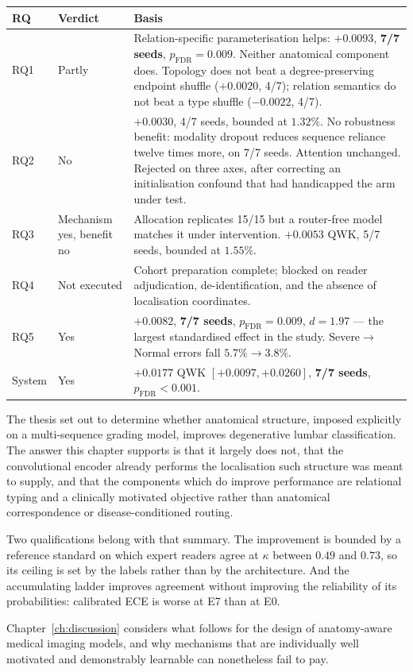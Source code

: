\documentclass[12pt,a4paper]{report}
\begin{document}
\begin{center}
\begin{tabular}{llp{6.6cm}}
\toprule
RQ & Verdict & Basis \\
\midrule
RQ1 & Partly & Relation-specific parameterisation helps: $+0.0093$,
\textbf{7/7 seeds}, $p_{\mathrm{FDR}} = 0.009$. Neither anatomical component
does. Topology does not beat a degree-preserving endpoint shuffle ($+0.0020$,
4/7); relation semantics do not beat a type shuffle ($-0.0022$, 4/7). \\
RQ2 & No & $+0.0030$, 4/7 seeds, bounded at $1.32\%$. No robustness
benefit: modality dropout reduces sequence reliance twelve times more, on 7/7
seeds. Attention unchanged. Rejected on three axes, after correcting an
initialisation confound that had handicapped the arm under test. \\
RQ3 & Mechanism yes, benefit no & Allocation replicates 15/15 but a router-free
model matches it under intervention. $+0.0053$ QWK, 5/7 seeds, bounded at
$1.55\%$. \\
RQ4 & Not executed & Cohort preparation complete; blocked on reader
adjudication, de-identification, and the absence of localisation coordinates. \\
RQ5 & Yes & $+0.0082$, \textbf{7/7 seeds}, $p_{\mathrm{FDR}} = 0.009$, $d = 1.97$
--- the largest standardised effect in the study. Severe$\rightarrow$Normal
errors fall $5.7\% \rightarrow 3.8\%$. \\
\midrule
System & Yes & $+0.0177$ QWK $[+0.0097, +0.0260]$, \textbf{7/7 seeds},
$p_{\mathrm{FDR}} < 0.001$. \\
\bottomrule
\end{tabular}
\end{center}

The thesis set out to determine whether anatomical structure, imposed explicitly
on a multi-sequence grading model, improves degenerative lumbar classification.
The answer this chapter supports is that it largely does not, that the
convolutional encoder already performs the localisation such structure was meant
to supply, and that the components which do improve performance are relational
typing and a clinically motivated objective rather than anatomical correspondence
or disease-conditioned routing.

Two qualifications belong with that summary. The improvement is bounded by a
reference standard on which expert readers agree at $\kappa$ between $0.49$ and
$0.73$, so its ceiling is set by the labels rather than by the architecture. And
the accumulating ladder improves agreement without improving the reliability of
its probabilities: calibrated ECE is worse at E7 than at E0.

Chapter~\ref{ch:discussion} considers what follows for the design of anatomy-aware
medical imaging models, and why mechanisms that are individually well motivated
and demonstrably learnable can nonetheless fail to pay.
\end{document}
